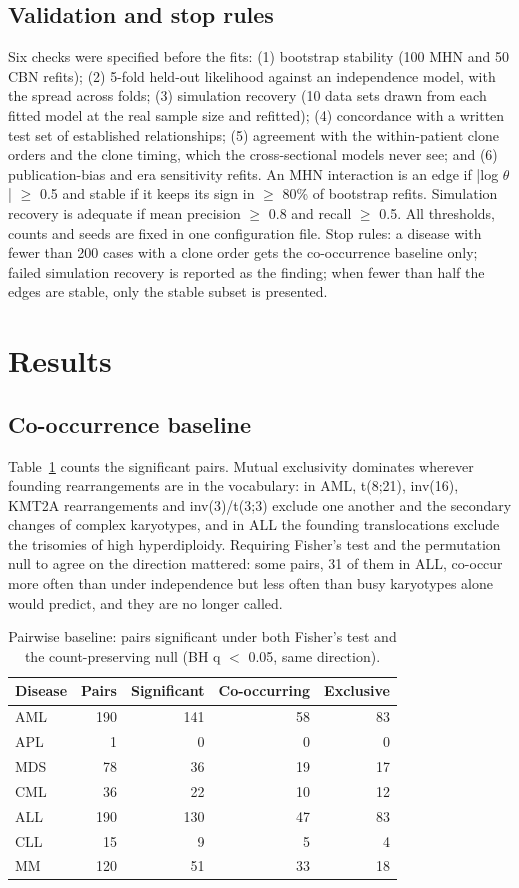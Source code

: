 \documentclass[conference]{IEEEtran}
\begin{document}
\subsection{Validation and stop rules}
Six checks were specified before the fits: (1) bootstrap stability (100 MHN and 50 CBN refits); (2) 5-fold held-out likelihood against an independence model, with the spread across folds; (3) simulation recovery (10 data sets drawn from each fitted model at the real sample size and refitted); (4) concordance with a written test set of established relationships; (5) agreement with the within-patient clone orders and the clone timing, which the cross-sectional models never see; and (6) publication-bias and era sensitivity refits. An MHN interaction is an edge if |log $\theta$| $\geq$ 0.5 and stable if it keeps its sign in $\geq$ 80\% of bootstrap refits. Simulation recovery is adequate if mean precision $\geq$ 0.8 and recall $\geq$ 0.5. All thresholds, counts and seeds are fixed in one configuration file. Stop rules: a disease with fewer than 200 cases with a clone order gets the co-occurrence baseline only; failed simulation recovery is reported as the finding; when fewer than half the edges are stable, only the stable subset is presented.

\section{Results}
\subsection{Co-occurrence baseline}
Table~\ref{tab:cooc} counts the significant pairs. Mutual exclusivity dominates wherever founding rearrangements are in the vocabulary: in AML, t(8;21), inv(16), KMT2A rearrangements and inv(3)/t(3;3) exclude one another and the secondary changes of complex karyotypes, and in ALL the founding translocations exclude the trisomies of high hyperdiploidy. Requiring Fisher's test and the permutation null to agree on the direction mattered: some pairs, 31 of them in ALL, co-occur more often than under independence but less often than busy karyotypes alone would predict, and they are no longer called.

\begin{table}[!t]
\centering
\caption{Pairwise baseline: pairs significant under both Fisher's test and the count-preserving null (BH q $<$ 0.05, same direction).}
\label{tab:cooc}
\footnotesize
\setlength{\tabcolsep}{3pt}
\begin{tabular}{lrrrr}
\toprule
\textbf{Disease} & \textbf{Pairs} & \textbf{Significant} & \textbf{Co-occurring} & \textbf{Exclusive} \\
\midrule
AML & 190 & 141 & 58 & 83 \\
APL & 1 & 0 & 0 & 0 \\
MDS & 78 & 36 & 19 & 17 \\
CML & 36 & 22 & 10 & 12 \\
ALL & 190 & 130 & 47 & 83 \\
CLL & 15 & 9 & 5 & 4 \\
MM & 120 & 51 & 33 & 18 \\
\bottomrule
\end{tabular}
\end{table}
\end{document}
